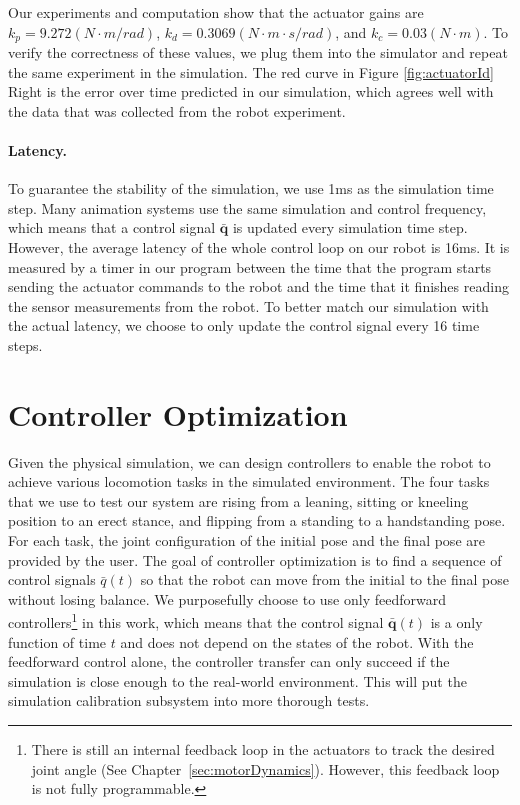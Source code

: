 Our experiments and computation show that the actuator gains are $k_p=9.272(N\cdot m/rad)$, $k_d=0.3069(N\cdot m\cdot s/rad)$, and $k_c=0.03(N\cdot m)$. To verify the correctness of these values, we plug them into the simulator and repeat the same experiment in the simulation. The red curve in Figure \ref{fig:actuatorId} Right is the error over time predicted in our simulation, which agrees well with the data that was collected from the robot experiment.

\paragraph{Latency.} To guarantee the stability of the simulation, we use 1ms as the simulation time step. Many animation systems use the same simulation and control frequency, which means that a control signal $\bar{\mathbf{q}}$ is updated every simulation time step. However, the average latency of the whole control loop on our robot is 16ms. It is measured by a timer in our program between the time that the program starts sending the actuator commands to the robot and the time that it finishes reading the sensor measurements from the robot. To better match our simulation with the actual latency, we choose to only update the control signal every 16 time steps.

\section{Controller Optimization}

Given the physical simulation, we can design controllers to enable the robot to achieve various locomotion tasks in the simulated environment. The four tasks that we use to test our system are rising from a leaning, sitting or kneeling position to an erect stance, and flipping from a standing to a handstanding pose. For each task, the joint configuration of the initial pose and the final pose are provided by the user. The goal of controller optimization is to find a sequence of control signals $\bar{q}(t)$ so that the robot can move from the initial to the final pose without losing balance. We purposefully choose to use only feedforward controllers\footnote{There is still an internal feedback loop in the actuators to track the desired joint angle (See Chapter~\ref{sec:motorDynamics}). However, this feedback loop is not fully programmable.} in this work, which means that the control signal $\bar{\mathbf{q}}(t)$ is a only function of time $t$ and does not depend on the states of the robot. With the feedforward control alone, the controller transfer can only succeed if the simulation is close enough to the real-world environment. This will put the simulation calibration subsystem into more thorough tests.

